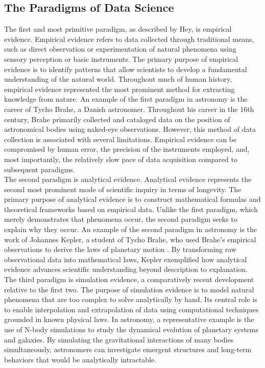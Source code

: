 \documentclass[manuscript,linenumbers,longauthor]{aastex631}
\begin{document}
\subsection{The Paradigms of Data Science}
The first and most primitive paradigm, as described by Hey, is empirical evidence. Empirical evidence refers to data collected through traditional means, such as direct observation or experimentation of natural phenomena using sensory perception or basic instruments. The primary purpose of empirical evidence is to identify patterns that allow scientists to develop a fundamental understanding of the natural world. Throughout much of human history, empirical evidence represented the most prominent method for extracting knowledge from nature. An example of the first paradigm in astronomy is the career of Tycho Brahe, a Danish astronomer. Throughout his career in the 16th century, Brahe primarily collected and cataloged data on the position of astronomical bodies using naked-eye observations. However, this method of data collection is associated with several limitations. Empirical evidence can be compromised by human error, the precision of the instruments employed, and, most importantly, the relatively slow pace of data acquisition compared to subsequent paradigms.
\\The second paradigm is analytical evidence. Analytical evidence represents the second most prominent mode of scientific inquiry in terms of longevity. The primary purpose of analytical evidence is to construct mathematical formulas and theoretical frameworks based on empirical data. Unlike the first paradigm, which merely demonstrates that phenomena occur, the second paradigm seeks to explain why they occur. An example of the second paradigm in astronomy is the work of Johannes Kepler, a student of Tycho Brahe, who used Brahe’s empirical observations to derive the laws of planetary motion \citep{heyFourthParadigmDataIntensive2009}. By transforming raw observational data into mathematical laws, Kepler exemplified how analytical evidence advances scientific understanding beyond description to explanation.%
\\The third paradigm is simulation evidence, a comparatively recent development relative to the first two. The purpose of simulation evidence is to model natural phenomena that are too complex to solve analytically by hand. Its central role is to enable interpolation and extrapolation of data using computational techniques grounded in known physical laws. In astronomy, a representative example is the use of N-body simulations to study the dynamical evolution of planetary systems and galaxies. By simulating the gravitational interactions of many bodies simultaneously, astronomers can investigate emergent structures and long-term behaviors that would be analytically intractable.%
\end{document}
